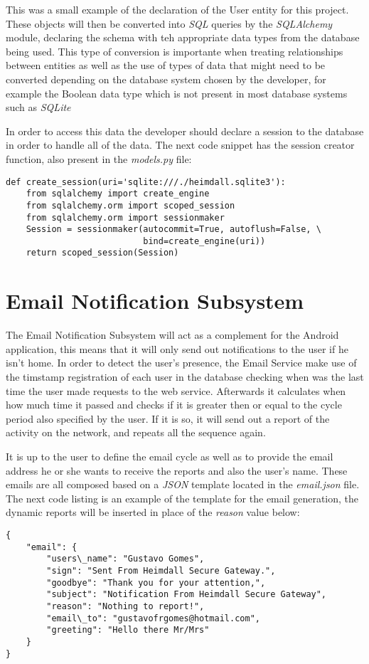 This was a small example of the declaration of the User entity for this project.
These objects will then be converted into \emph{\ac{SQL}} queries by the
\emph{SQLAlchemy} module, declaring the schema with teh appropriate data types
from the database being used. This type of conversion is importante when
treating relationships between entities as well as the use of types of data that
might need to be converted depending on the database system chosen by the
developer, for example the Boolean data type which is not present in most
database systems such as \emph{SQLite}

In order to access this data the developer should declare a session to the
database in order to handle all of the data. The next code snippet has the
session creator function, also present in the \emph{models.py} file:
\begin{lstlisting}[caption=Example of session creator function.]
def create_session(uri='sqlite:///./heimdall.sqlite3'):
    from sqlalchemy import create_engine
    from sqlalchemy.orm import scoped_session
    from sqlalchemy.orm import sessionmaker
    Session = sessionmaker(autocommit=True, autoflush=False, \
                           bind=create_engine(uri))
    return scoped_session(Session)
\end{lstlisting}

\section{Email Notification Subsystem}
\label{chap4:sec:email-sys}
The Email Notification Subsystem will act as a complement for the Android
application, this means that it will only send out notifications to the user if
he isn't home. In order to detect the user's presence, the Email Service make
use of the timstamp registration of each user in the database checking when was
the last time the user made requests to the web service. Afterwards it
calculates when how much time it passed and checks if it is greater then or
equal to the cycle period also specified by the user. If it is so, it will send
out a report of the activity on the network, and repeats all the sequence again.

It is up to the user to define the email cycle as well as to provide the email
address he or she wants to receive the reports and also the user's name. These
emails are all composed based on a \emph{\ac{JSON}} template located in the
\emph{email.json} file. The next code listing is an example of the template for
the email generation, the dynamic reports will be inserted in place of the
\emph{reason} value below:
\begin{lstlisting}[caption=Example of the email JSON template.]
{
    "email": {
        "users\_name": "Gustavo Gomes",
        "sign": "Sent From Heimdall Secure Gateway.",
        "goodbye": "Thank you for your attention,",
        "subject": "Notification From Heimdall Secure Gateway",
        "reason": "Nothing to report!",
        "email\_to": "gustavofrgomes@hotmail.com",
        "greeting": "Hello there Mr/Mrs"
    }
}
\end{lstlisting}

